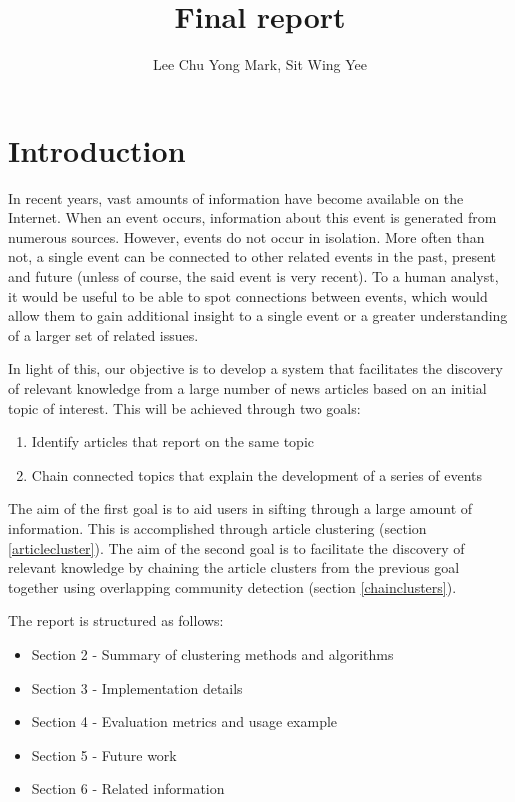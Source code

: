\documentclass[12pt]{article}
\begin{document}
\title{Final report}
\author{Lee Chu Yong Mark, Sit Wing Yee}
\maketitle

\section{Introduction}
In recent years, vast amounts of information have become available on the Internet. When an event occurs, information about this event is generated from numerous sources. However, events do not occur in isolation. More often than not, a single event can be connected to other related events in the past, present and future (unless of course, the said event is very recent). To a human analyst, it would be useful to be able to spot connections between events, which would allow them to gain additional insight to a single event or a greater understanding of a larger set of related issues.

In light of this, our objective is to develop a system that facilitates the discovery of relevant knowledge from a large number of news articles based on an initial topic of interest. This will be achieved through two goals:

\begin{enumerate}[noitemsep]
\item Identify articles that report on the same topic
\item Chain connected topics that explain the development of a series of events
\end{enumerate}

The aim of the first goal is to aid users in sifting through a large amount of information. This is accomplished through article clustering (section \ref{articlecluster}). The aim of the second goal is to facilitate the discovery of relevant knowledge by chaining the article clusters from the previous goal together using overlapping community detection (section \ref{chainclusters}).

The report is structured as follows:
\begin{itemize}[noitemsep]
\item Section 2 - Summary of clustering methods and algorithms
\item Section 3 - Implementation details
\item Section 4 - Evaluation metrics and usage example
\item Section 5 - Future work
\item Section 6 - Related information
\end{itemize}
\end{document}
